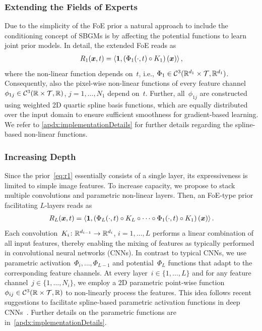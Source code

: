 \documentclass{article}
\newcommand{\C}{\mathcal{C}}
\newcommand{\T}{\mathcal{T}}
\newcommand{\scal}[2]{\left\langle#1,#2\right\rangle}
\renewcommand{\vec}[1]{\mathbf{#1}}
\theoremstyle{plain}
\theoremstyle{definition}
\theoremstyle{remark}
\begin{document}
\subsubsection{Extending the Fields of Experts}
Due to the simplicity of the FoE prior a natural approach to include the conditioning concept of SBGMs is by affecting the potential functions to learn joint prior models.
In detail, the extended FoE reads as
\begin{align}\label{eq:r1}
R_1(\vx,t) = \scal{\vec{1}}{\left(\Phi_1(\cdot, t) \circ K_1\right)(\vx)},
\end{align}
where the non-linear function depends on~$t$, i.e., $\Phi_1\in\C^3(\R^{d_1}\times\T,\R^{d_1})$.
Consequently, also the pixel-wise non-linear functions of every feature channel~$\phi_{1j}\in\C^3(\R\times\T,\R)$, $j=1,\ldots,N_1$ depend on~$t$. 
Further, all~$\phi_{1j}$ are constructed using weighted 2D quartic spline basis functions, which are equally distributed over the input domain to ensure sufficient smoothness for gradient-based learning.
We refer to \cref{apdx:implementationDetails} for further details regarding the spline-based non-linear functions.

\subsubsection{Increasing Depth}
Since the prior~\eqref{eq:r1} essentially consists of a single layer, its expressiveness is limited to simple image features.
To increase capacity, we propose to stack multiple convolutions and parametric non-linear layers.
Then, an FoE-type prior facilitating $L$-layers reads as
\begin{align} \label{eq:RL}
R_L(\vx,t) = \scal{\vec{1}}{\left(\Phi_L(\cdot,t)\circ K_L\circ\cdots\circ\Phi_1(\cdot, t) \circ K_1\right)(\vx)}.
\end{align}
Each convolution~$K_i\colon\mathbb{R}^{d_{i-1}}\to\mathbb{R}^{d_i}$, $i=1,\ldots,L$ performs a linear combination of all input features, thereby enabling the mixing of features as typically performed in convolutional neural networks (CNNs).
In contrast to typical CNNs, we use parametric activation~$\Phi_i,\ldots,\Phi_{L-1}$ and potential~$\Phi_L$ functions that adapt to the corresponding feature channels.
At every layer~$i\in\{1,\ldots,L\}$ and for any feature channel~$j\in\{1,\ldots,N_i\}$, we employ a 2D parametric point-wise function~$\phi_{ij}\in\C^3(\R\times\T,\R)$ to non-linearly process the features.
This idea follows recent suggestions to facilitate spline-based parametric activation functions in deep CNNs~\citep{OcMe18,AzGu20}.
Further details on the parametric functions are in~\cref{apdx:implementationDetails}.
\end{document}
